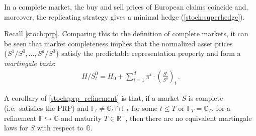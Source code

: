     \begin{property}
        In a complete market, the buy and sell prices of European claims coincide and, moreover, the replicating strategy gives a minimal hedge (\cref{stoch:superhedge}).
    \end{property}

    \begin{remark}
        Recall \cref{stoch:prp}. Comparing this to the definition of complete markets, it can be seen that market completeness implies that the normalized asset prices $\{S^1/S^0,\ldots,S^d/S^0\}$ satisfy the predictable representation property and form a \textit{martingale basis}:
        \begin{gather}
            H/S^0_t = H_0 + \sum_{i=1}^d\pi^i\cdot\left(\frac{S^i}{S^0}\right)_t\,.
        \end{gather}
    \end{remark}

    \begin{remark}
        A corollary of \cref{stoch:prp_refinement} is that, if a market $S$ is complete (i.e.~satisfies the PRP) and $\mathbb{F}_t\neq\mathbb{G}_t\cap\mathbb{F}_T$ for some $t\leq T$ or $\mathbb{F}_T=\mathbb{G}_T$, for a refinement $\mathbb{F}\hookrightarrow\mathbb{G}$ and maturity $T\in\mathbb{R}^+$, then there are no equivalent martingale laws for $S$ with respect to $\mathbb{G}$.
        
    \end{remark}


